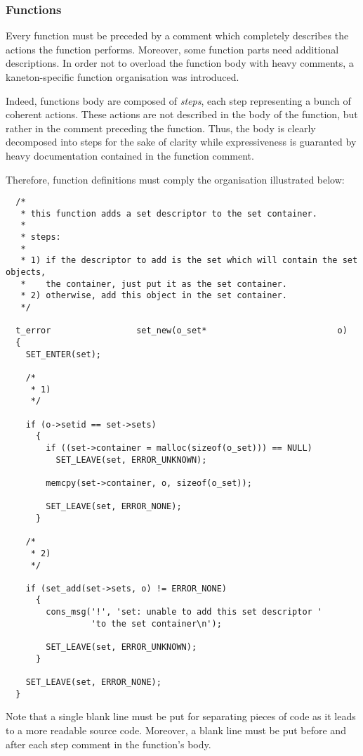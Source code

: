 \subsubsection{Functions}

Every function must be preceded by a comment which completely describes the
actions the function performs. Moreover, some function parts need additional
descriptions. In order not to overload the function body with heavy comments,
a kaneton-specific function organisation was introduced.

Indeed, functions body are composed of \textit{steps}, each step representing
a bunch of coherent actions. These actions are not described in the body
of the function, but rather in the comment preceding the function. Thus,
the body is clearly decomposed into steps for the sake of clarity
while expressiveness is guaranted by heavy documentation contained in the
function comment.

Therefore, function definitions must comply the organisation illustrated
below:

\begin{verbatim}
  /*
   * this function adds a set descriptor to the set container.
   *
   * steps:
   *
   * 1) if the descriptor to add is the set which will contain the set objects,
   *    the container, just put it as the set container.
   * 2) otherwise, add this object in the set container.
   */

  t_error                 set_new(o_set*                          o)
  {
    SET_ENTER(set);

    /*
     * 1)
     */

    if (o->setid == set->sets)
      {
        if ((set->container = malloc(sizeof(o_set))) == NULL)
          SET_LEAVE(set, ERROR_UNKNOWN);

        memcpy(set->container, o, sizeof(o_set));

        SET_LEAVE(set, ERROR_NONE);
      }

    /*
     * 2)
     */

    if (set_add(set->sets, o) != ERROR_NONE)
      {
        cons_msg('!', 'set: unable to add this set descriptor '
                 'to the set container\n');

        SET_LEAVE(set, ERROR_UNKNOWN);
      }

    SET_LEAVE(set, ERROR_NONE);
  }
\end{verbatim}

Note that a single blank line must be put for separating pieces of code
as it leads to a more readable source code. Moreover, a blank line must
be put before and after each step comment in the function's body.

